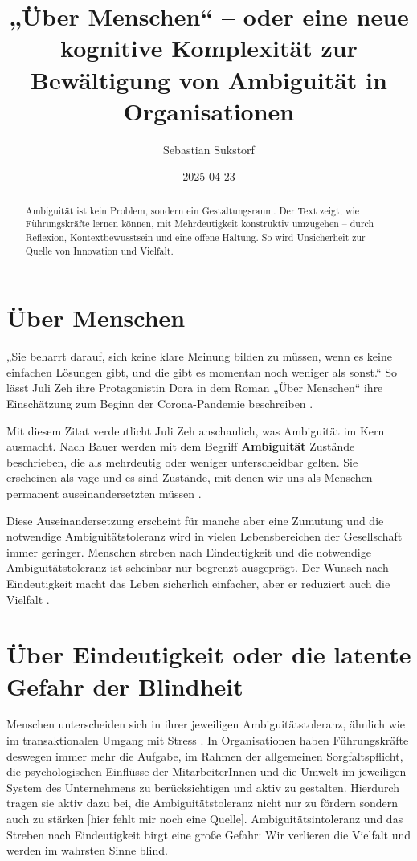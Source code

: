 \documentclass[
  ngerman,
  letterpaper,
  DIV=11]{scrartcl}
\title{„Über Menschen`` -- oder eine neue kognitive Komplexität zur
Bewältigung von Ambiguität in Organisationen}
\author{Sebastian Sukstorf}
\date{2025-04-23}
\renewcommand*\contentsname{Inhaltsverzeichnis}
\newcommand\contentsname{Inhaltsverzeichnis}
\begin{document}
\maketitle
\begin{abstract}
Ambiguität ist kein Problem, sondern ein Gestaltungsraum. Der Text
zeigt, wie Führungskräfte lernen können, mit Mehrdeutigkeit konstruktiv
umzugehen -- durch Reflexion, Kontextbewusstsein und eine offene
Haltung. So wird Unsicherheit zur Quelle von Innovation und Vielfalt.
\end{abstract}

\renewcommand*\contentsname{Inhaltsverzeichnis}
{
\hypersetup{linkcolor=}
\setcounter{tocdepth}{3}
\tableofcontents
}

\section{Über Menschen}\label{uxfcber-menschen}

„Sie beharrt darauf, sich keine klare Meinung bilden zu müssen, wenn es
keine einfachen Lösungen gibt, und die gibt es momentan noch weniger als
sonst.`` So lässt Juli Zeh ihre Protagonistin Dora in dem Roman „Über
Menschen`` ihre Einschätzung zum Beginn der Corona-Pandemie beschreiben
\autocite[28.]{zeh2022}.

Mit diesem Zitat verdeutlicht Juli Zeh anschaulich, was Ambiguität im
Kern ausmacht. Nach Bauer werden mit dem Begriff \textbf{Ambiguität}
Zustände beschrieben, die als mehrdeutig oder weniger unterscheidbar
gelten. Sie erscheinen als vage und es sind Zustände, mit denen wir uns
als Menschen permanent auseinandersetzten müssen
\autocite[13]{bauer2018}.

Diese Auseinandersetzung erscheint für manche aber eine Zumutung und die
notwendige Ambiguitätstoleranz wird in vielen Lebensbereichen der
Gesellschaft immer geringer. Menschen streben nach Eindeutigkeit und die
notwendige Ambiguitätstoleranz ist scheinbar nur begrenzt ausgeprägt.
Der Wunsch nach Eindeutigkeit macht das Leben sicherlich einfacher, aber
er reduziert auch die Vielfalt \autocite{bauer2018}.

\section{Über Eindeutigkeit oder die latente Gefahr der
Blindheit}\label{uxfcber-eindeutigkeit-oder-die-latente-gefahr-der-blindheit}

Menschen unterscheiden sich in ihrer jeweiligen Ambiguitätstoleranz,
ähnlich wie im transaktionalen Umgang mit Stress \autocite{lazarus1984}.
In Organisationen haben Führungskräfte deswegen immer mehr die Aufgabe,
im Rahmen der allgemeinen Sorgfaltspflicht, die psychologischen
Einflüsse der MitarbeiterInnen und die Umwelt im jeweiligen System des
Unternehmens zu berücksichtigen und aktiv zu gestalten. Hierdurch tragen
sie aktiv dazu bei, die Ambiguitätstoleranz nicht nur zu fördern sondern
auch zu stärken {[}hier fehlt mir noch eine Quelle{]}.
Ambiguitätsintoleranz und das Streben nach Eindeutigkeit birgt eine
große Gefahr: Wir verlieren die Vielfalt und werden im wahrsten Sinne
blind.
\end{document}
